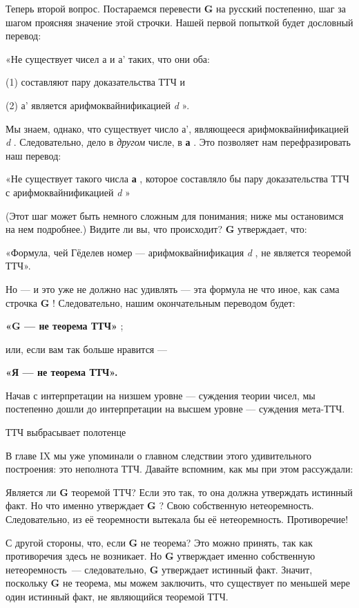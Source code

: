 \documentclass[../main.tex]{subfiles}
\begin{document}
Теперь второй вопрос. Постараемся перевести \textbf{G} на русский постепенно, шаг за шагом проясняя значение этой строчки. Нашей первой попыткой будет дословный перевод:

«Не существует чисел а и а' таких, что они оба:

(1) составляют пару доказательства ТТЧ и

(2) а' является арифмоквайнификацией \emph{d} ».

Мы знаем, однако, что существует число а', являющееся арифмоквайнификацией \emph{d} . Следовательно, дело в \emph{другом} числе, в \textbf{а} . Это позволяет нам перефразировать наш перевод:

«Не существует такого числа \textbf{а} , которое составляло бы пару доказательства ТТЧ с арифмоквайнификацией \emph{d} »

(Этот шаг может быть немного сложным для понимания; ниже мы остановимся на нем подробнее.) Видите ли вы, что происходит? \textbf{G} утверждает, что:

«Формула, чей Гёделев номер --- арифмоквайнификация \emph{d} , не является теоремой ТТЧ».

Но --- и это уже не должно нас удивлять --- эта формула не что иное, как сама строчка \textbf{G} ! Следовательно, нашим окончательным переводом будет:

\textbf{«G --- не теорема ТТЧ»} ;

или, если вам так больше нравится ---

\textbf{«Я --- не теорема ТТЧ».}

Начав с интерпретации на низшем уровне --- суждения теории чисел, мы постепенно дошли до интерпретации на высшем уровне --- суждения мета-ТТЧ.

ТТЧ выбрасывает полотенце

В главе IX мы уже упоминали о главном следствии этого удивительного построения: это неполнота ТТЧ\@. Давайте вспомним, как мы при этом рассуждали:

Является ли \textbf{G} теоремой ТТЧ? Если это так, то она должна утверждать истинный факт. Но что именно утверждает \textbf{G} ? Свою собственную нетеоремность. Следовательно, из её теоремности вытекала бы её нетеоремность. Противоречие!

С другой стороны, что, если \textbf{G} не теорема? Это можно принять, так как противоречия здесь не возникает. Но \textbf{G} утверждает именно собственную нетеоремность~--- следовательно, \textbf{G} утверждает истинный факт. Значит, поскольку \textbf{G} не теорема, мы можем заключить, что существует по меньшей мере один истинный факт, не являющийся теоремой ТТЧ.
\end{document}
